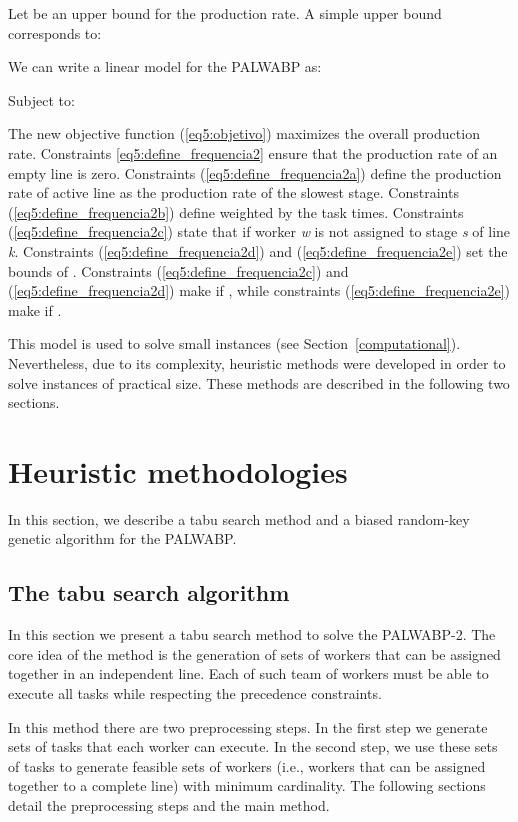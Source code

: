 \documentclass{singlecol-new}
\begin{document}
Let  be an upper bound for the production rate. A simple upper bound corresponds to:



We can write a linear model for the PALWABP as:



Subject to:



The new objective function (\ref{eq5:objetivo}) maximizes the overall production rate. Constraints \ref{eq5:define_frequencia2} ensure that the production rate of an empty line is zero. Constraints (\ref{eq5:define_frequencia2a}) define the production rate of active line as the production rate of the slowest stage. Constraints (\ref{eq5:define_frequencia2b}) define  weighted by the task times. Constraints (\ref{eq5:define_frequencia2c}) state that  if worker \textit{w} is not assigned to stage \textit{s} of line \textit{k}. Constraints (\ref{eq5:define_frequencia2d}) and (\ref{eq5:define_frequencia2e}) set the bounds of . Constraints (\ref{eq5:define_frequencia2c}) and (\ref{eq5:define_frequencia2d}) make  if , while constraints (\ref{eq5:define_frequencia2e}) make  if .
  
  
This model is used to solve small instances (see Section~\ref{computational}). Nevertheless, due to its complexity, heuristic methods were developed in order to solve instances of practical size. These methods are described in the following two sections.

\section{Heuristic methodologies}\label{methodologies}

In this section, we describe a tabu search method and a biased random-key genetic algorithm for the PALWABP.

\subsection{The tabu search algorithm}\label{heuristics}

In this section we present a tabu search method to solve the PALWABP-2. The core idea of the method is the generation of sets of workers that can be assigned together in an independent line. Each of such team of workers must be able to execute all tasks while respecting the precedence constraints.

In this method there are two preprocessing steps. In the first step we generate sets of tasks that each worker can execute. In the second step, we use these sets of tasks to generate feasible sets of workers (i.e., workers that can be assigned together to a complete line) with minimum cardinality. The following sections detail the preprocessing steps and the main method.
\end{document}
